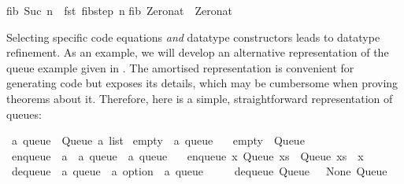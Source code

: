 \begin{isabellebody}
\begin{isamarkuptext}
\begin{typewriter}
fib\ {\isacharparenleft}Suc\ n{\isacharparenright}\ {\isacharequal}\ fst\ {\isacharparenleft}fib{\isacharunderscore}step\ n{\isacharparenright}{\isacharsemicolon}\isanewline
fib\ Zero{\isacharunderscore}nat\ {\isacharequal}\ Zero{\isacharunderscore}nat{\isacharsemicolon}
  \end{typewriter}%
\end{isamarkuptext}%
\isamarkuptrue%
%
\endisatagquote
{\isafoldquote}%
%
\isadelimquote
%
\endisadelimquote
%
\isamarkuptrue%
%
\begin{isamarkuptext}%
Selecting specific code equations \emph{and} datatype constructors
  leads to datatype refinement.  As an example, we will develop an
  alternative representation of the queue example given in
  .  The amortised representation is
  convenient for generating code but exposes its 
  details, which may be cumbersome when proving theorems about it.
  Therefore, here is a simple, straightforward representation of
  queues:%
\end{isamarkuptext}%
\isamarkuptrue%
%
\isadelimquote
%
\endisadelimquote
%
\isatagquote
{}\isamarkupfalse%
\ {\isacharprime}a\ queue\ {\isacharequal}\ Queue\ {\isachardoublequoteopen}{\isacharprime}a\ list{\isachardoublequoteclose}\isanewline
\isanewline
{}\isamarkupfalse%
\ empty\ {\isacharcolon}{\isacharcolon}\ {\isachardoublequoteopen}{\isacharprime}a\ queue{\isachardoublequoteclose}\ \isanewline
\ \ {\isachardoublequoteopen}empty\ {\isacharequal}\ Queue\ {\isacharbrackleft}{\isacharbrackright}{\isachardoublequoteclose}\isanewline
\isanewline
{}\isamarkupfalse%
\ enqueue\ {\isacharcolon}{\isacharcolon}\ {\isachardoublequoteopen}{\isacharprime}a\ {\isasymRightarrow}\ {\isacharprime}a\ queue\ {\isasymRightarrow}\ {\isacharprime}a\ queue{\isachardoublequoteclose}\ \isanewline
\ \ {\isachardoublequoteopen}enqueue\ x\ {\isacharparenleft}Queue\ xs{\isacharparenright}\ {\isacharequal}\ Queue\ {\isacharparenleft}xs\ {\isacharat}\ {\isacharbrackleft}x{\isacharbrackright}{\isacharparenright}{\isachardoublequoteclose}\isanewline
\isanewline
{}\isamarkupfalse%
\ dequeue\ {\isacharcolon}{\isacharcolon}\ {\isachardoublequoteopen}{\isacharprime}a\ queue\ {\isasymRightarrow}\ {\isacharprime}a\ option\ {\isasymtimes}\ {\isacharprime}a\ queue{\isachardoublequoteclose}\ \isanewline
\ \ \ \ {\isachardoublequoteopen}dequeue\ {\isacharparenleft}Queue\ {\isacharbrackleft}{\isacharbrackright}{\isacharparenright}\ {\isacharequal}\ {\isacharparenleft}None{\isacharcomma}\ Queue\ {\isacharbrackleft}{\isacharbrackright}{\isacharparenright}{\isachardoublequoteclose}\isanewline

\end{isabellebody}
